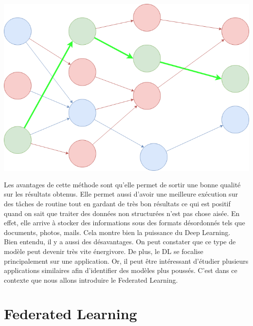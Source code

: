 \documentclass[12pt,a4paper,french]{report}
\begin{document}
\begin{center}
	\includegraphics[scale=0.4]{deep_learning_schema}
	\label{fig1}
\end{center}

Les avantages de cette méthode sont qu'elle permet de sortir une bonne qualité sur les résultats obtenus. Elle permet aussi d'avoir une meilleure exécution sur des tâches de routine tout en gardant de très bon résultats ce qui est positif quand on sait que traiter des données non structurées n'est pas chose aisée. En effet, elle arrive à stocker des informations sous des formats désordonnés tels que documents, photos, mails. Cela montre bien la puissance du Deep Learning.\\

Bien entendu, il y a aussi des désavantages. On peut constater que ce type de modèle peut devenir très vite énergivore. De plus, le DL se focalise principalement sur une application. Or, il peut être intéressant d'étudier plusieurs applications similaires afin d'identifier des modèles plus poussés. C'est dans ce contexte que nous allons introduire le Federated Learning.
\pagebreak


\chapter{Federated Learning}
\end{document}
